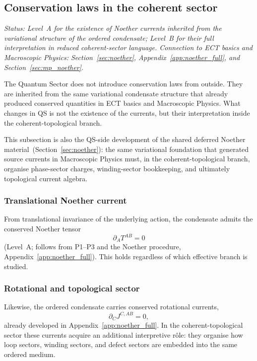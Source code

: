\subsection{Conservation laws in the coherent sector}
\label{sec:qs_conservation}

\textit{Status: Level~A for the existence of Noether currents inherited
from the variational structure of the ordered condensate; Level~B for
their full interpretation in reduced coherent-sector language.
Connection to ECT basics and Macroscopic Physics:
Section~\ref{sec:noether}, Appendix~\ref{app:noether_full}, and
Section~\ref{sec:mp_noether}.}

\medskip
The Quantum Sector does not introduce conservation laws from outside.
They are inherited from the same variational condensate structure that
already produced conserved quantities in ECT basics and Macroscopic
Physics.
What changes in QS is not the existence of the currents, but their
interpretation inside the coherent-topological branch.

This subsection is also the QS-side development of the shared
deferred Noether material~(Section~\ref{sec:noether}):
the same variational foundation that generated source currents in
Macroscopic Physics must, in the coherent-topological branch,
organise phase-sector charges, winding-sector bookkeeping, and
ultimately topological current algebra.

\subsubsection*{Translational Noether current}

From translational invariance of the underlying action, the condensate
admits the conserved Noether tensor
\begin{equation}
  \label{eq:qs_noether_T}
  \partial_A T^{AB} = 0
\end{equation}
(Level~A; follows from P1--P3 and the Noether procedure,
Appendix~\ref{app:noether_full}).
This holds regardless of which effective branch is studied.

\subsubsection*{Rotational and topological sector}

Likewise, the ordered condensate carries conserved rotational currents,
\begin{equation}
  \label{eq:qs_noether_J}
  \partial_C J^{C,AB} = 0,
\end{equation}
already developed in Appendix~\ref{app:noether_full}.
In the coherent-topological sector these currents acquire an additional
interpretive rôle: they organise how loop sectors, winding sectors, and
defect sectors are embedded into the same ordered medium.

